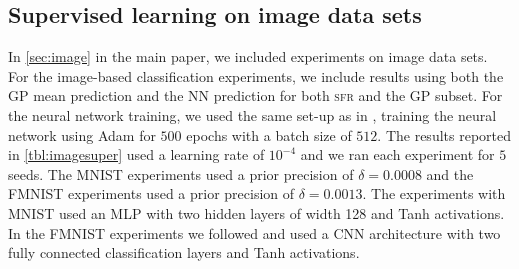 \documentclass{article}
\newcommand{\our}{\textsc{sfr}\xspace}
\begin{document}
\subsection{Supervised learning on image data sets}
\label{app:image}

In \cref{sec:image} in the main paper, we included experiments on image data sets. For the image-based classification experiments, we include results using both the GP mean prediction and the NN prediction for both \our and the GP subset.
For the neural network training, we used the same set-up as in \cite{immer2021improving},
training the neural network using Adam for $500$ epochs with a batch size of $512$.
The results reported in \cref{tbl:imagesuper} used a learning rate of $10^{-4}$
and we ran each experiment for $5$ seeds.
The MNIST experiments used a prior precision of $\delta=0.0008$
and the FMNIST experiments used a prior precision of $\delta=0.0013$.
The experiments with MNIST  used an MLP with two hidden layers of width 128 and Tanh activations.
In the FMNIST experiments we followed \cite{immer2021improving} and used a CNN
architecture with two fully connected classification layers and Tanh activations.
\end{document}
